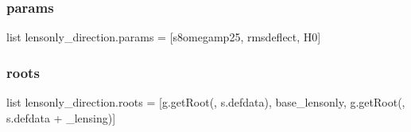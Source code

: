 \subsubsection{\texorpdfstring{params}{params}}
{\footnotesize\ttfamily list lensonly\+\_\+direction.\+params = \mbox{[}\textquotesingle{}s8omegamp25\textquotesingle{}, \textquotesingle{}rmsdeflect\textquotesingle{}, \textquotesingle{}H0\textquotesingle{}\mbox{]}}

\mbox{\label{namespacelensonly__direction_a62d23d1a04b35eed091d40fd954fcda8}} 
\subsubsection{\texorpdfstring{roots}{roots}}
{\footnotesize\ttfamily list lensonly\+\_\+direction.\+roots = \mbox{[}g.\+get\+Root(\textquotesingle{}\textquotesingle{}, s.\+defdata), \textquotesingle{}base\+\_\+lensonly\textquotesingle{}, g.\+get\+Root(\textquotesingle{}\textquotesingle{}, s.\+defdata + \textquotesingle{}\+\_\+lensing\textquotesingle{})\mbox{]}}

